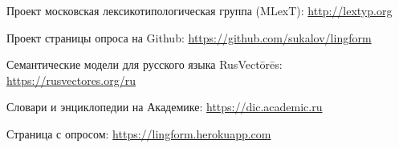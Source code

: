 \noindent \hypertarget{mlext}{Проект московская лексикотипологическая группа (MLexT)}:\; 
\url{http://lextyp.org} \medskip

\noindent \hypertarget{github}{Проект страницы опроса на Github}:\; 
\url{https://github.com/sukalov/lingform} \medskip

\noindent \hypertarget{rusvectores}{Семантические модели для русского языка RusVectōrēs}:\;
\url{https://rusvectores.org/ru} \medskip

\noindent Словари и энциклопедии на Академике:\; 
\url{https://dic.academic.ru} \medskip

\noindent \hypertarget{form}{Страница с опросом}:\; 
\url{https://lingform.herokuapp.com}\medskip




